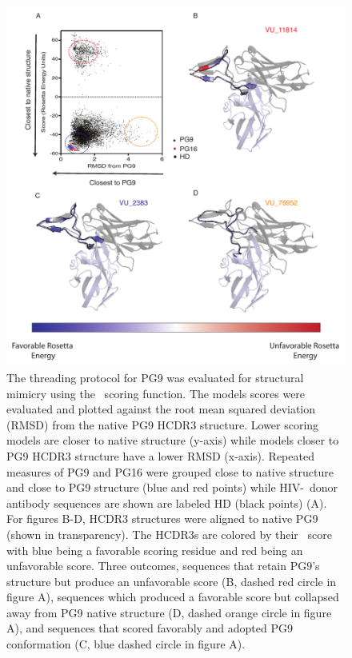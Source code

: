 \begin{figure}
   \centering
   \includegraphics[scale=.95,width=\columnwidth]{images/chapter3/figure3_9.pdf} %
   \caption[Threading PG9 Produces Three Structural Outcomes]{The threading protocol for PG9 was evaluated for structural mimicry using the \rosetta~scoring function. The models scores were evaluated and plotted against the root mean squared deviation (RMSD) from the native PG9 HCDR3 structure. Lower scoring models are closer to native structure (y-axis) while models closer to PG9 HCDR3 structure have a lower RMSD (x-axis). Repeated measures of PG9 and PG16 were grouped close to native structure and close to PG9 structure (blue and red points) while HIV-\naive~donor antibody sequences are shown are labeled HD (black points) (A). For figures B-D, HCDR3 structures were aligned to native PG9 (shown in transparency). The HCDR3s are colored by their \rosetta~score with blue being a favorable scoring residue and red being an unfavorable score. Three outcomes, sequences that retain PG9's structure but produce an unfavorable score (B, dashed red circle in figure A), sequences which produced a favorable score but collapsed away from PG9 native structure (D, dashed orange circle in figure A), and sequences that scored favorably and adopted PG9 conformation (C, blue dashed circle in figure A).}
   \label{fig:figure3_9}
\end{figure}


